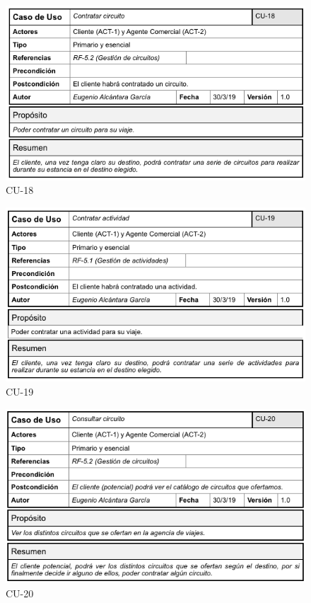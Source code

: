 \documentclass{article}
\begin{document}
	\begin{figure}[H]
		\centering
		\includegraphics[totalheight=8cm]{CU-18}
		\caption{CU-18}
		\label{fig:cu-18}
	\end{figure}

	\begin{figure}[H]
		\centering
		\includegraphics[totalheight=8cm]{CU-19}
		\caption{CU-19}
		\label{fig:cu-19}
	\end{figure}

	\begin{figure}[H]
		\centering
		\includegraphics[totalheight=8cm]{CU-20}
		\caption{CU-20}
		\label{fig:cu-20}
	\end{figure}
\end{document}

